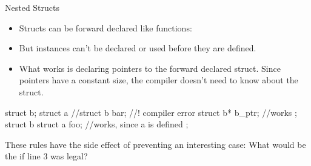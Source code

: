 \documentclass[10pt,graphics,aspectratio=169,table]{beamer}
\begin{document}
\begin{frame}[fragile]{Nested Structs}
   \begin{itemize}
       \item Structs can be forward declared like functions: 
       \item But instances can't be declared or used before they are defined.
       \item 
            What works is declaring pointers to the forward declared struct.
            Since pointers have a constant size, the compiler doesn't need to
            know about the struct.
   \end{itemize}

    \begin{codeblock}
struct b;
struct a{
    //struct b bar; //! compiler error
    struct b* b_ptr; //works
};
struct b{
    struct a foo; //works, since a is defined
};
    \end{codeblock}

    These rules have the side effect of preventing an interesting case:
    What would be the  if line 3 was legal?
\end{frame}
\end{document}
